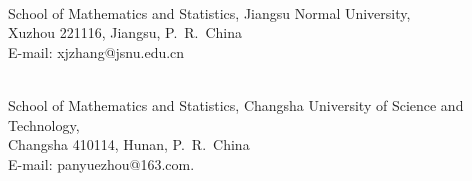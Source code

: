 \documentclass[a4paper,reqno]{amsart}
\numberwithin{equation}{section}
\theoremstyle{definition}
\begin{document}
\medskip
{\footnotesize
{}\\
School of Mathematics and Statistics, Jiangsu Normal University,\\
Xuzhou 221116, Jiangsu, P.~R.~China\\
E-mail: xjzhang@jsnu.edu.cn

\vspace{5mm}
\\
School of Mathematics and Statistics, Changsha University of Science and Technology,\\
Changsha 410114, Hunan, P.~R.~China\\
E-mail: panyuezhou@163.com.
\par}
\end{document}
